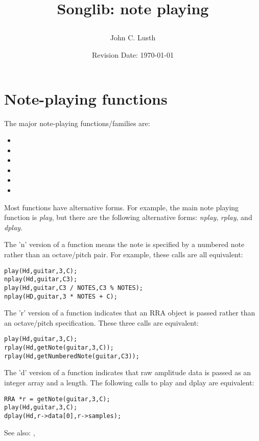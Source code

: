 \documentclass{article}
\title{Songlib: note playing\\
\date{Revision Date: \today}}
\author{John C. Lusth}
\begin{document}
\maketitle

\W\subsubsection*{}
\W\htmlrule

\section*{Note-playing functions}
The major note-playing functions/families are:

\begin{itemize}
\item
\item
\item
\item
\item
\item
\end{itemize}

Most functions have alternative forms. For example, the main note playing
function is {\it play}, but there are the following alternative forms:
{\it nplay}, {\it rplay}, and {\it dplay}.

The 'n' version of a function means the note is specified by a numbered
note rather than an octave/pitch pair. For example, these calls are
all equivalent:

\begin{verbatim}
play(Hd,guitar,3,C);
nplay(Hd,guitar,C3);
play(Hd,guitar,C3 / NOTES,C3 % NOTES);
nplay(HD,guitar,3 * NOTES + C);
\end{verbatim}

The 'r' version of a function indicates that an RRA object is passed
rather than an octave/pitch specification. These three calls are
equivalent:

\begin{verbatim}
play(Hd,guitar,3,C);
rplay(Hd,getNote(guitar,3,C));
rplay(Hd,getNumberedNote(guitar,C3));
\end{verbatim}

The 'd' version of a function indicates that raw amplitude data is passed
as an integer array and a length. The following calls to play and dplay
are equivalent:

\begin{verbatim}
RRA *r = getNote(guitar,3,C);
play(Hd,guitar,3,C);
dplay(Hd,r->data[0],r->samples);
\end{verbatim}

See also: ,
\end{document}

